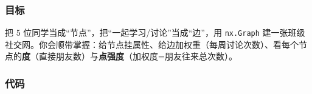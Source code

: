 \subsubsection{目标}\label{ux76eeux6807-24}

把 5 位同学当成``节点''，把``一起学习/讨论''当成``边''，用
\texttt{nx.Graph}
建一张班级社交网。你会顺带掌握：给节点挂属性、给边加权重（每周讨论次数）、看每个节点的\textbf{度}（直接朋友数）与\textbf{点强度}（加权度=朋友往来总次数）。

\subsubsection{代码}\label{ux4ee3ux7801-25}

\begin{Shaded}
\begin{Highlighting}[]

\NormalTok{plt.rcParams[}\NormalTok{] }\OperatorTok{=}\NormalTok{ [}\NormalTok{, }\NormalTok{, }\NormalTok{]}
\NormalTok{plt.rcParams[}\NormalTok{] }\OperatorTok{=} 
\OperatorTok{=}\OperatorTok{=}\NormalTok{)}

\OperatorTok{=}


\end{Highlighting}
\end{Shaded}
